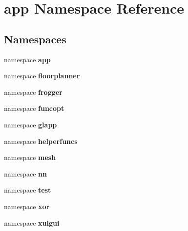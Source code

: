 \section{app Namespace Reference}
\label{namespaceapp}


\subsection*{Namespaces}
\begin{CompactItemize}
\item 
namespace {\bf app}
\item 
namespace {\bf floorplanner}
\item 
namespace {\bf frogger}
\item 
namespace {\bf funcopt}
\item 
namespace {\bf glapp}
\item 
namespace {\bf helperfuncs}
\item 
namespace {\bf mesh}
\item 
namespace {\bf nn}
\item 
namespace {\bf test}
\item 
namespace {\bf xor}
\item 
namespace {\bf xulgui}
\end{CompactItemize}
